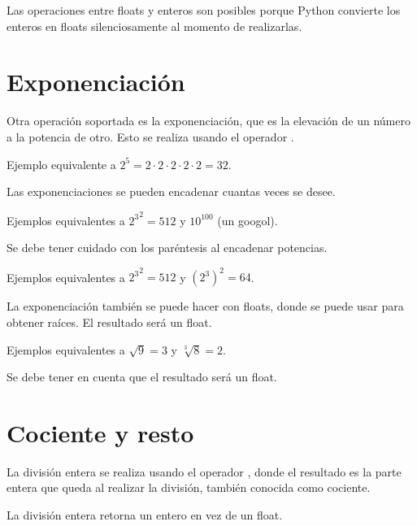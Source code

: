 Las operaciones entre floats y enteros son posibles porque Python convierte los enteros en floats silenciosamente al momento de realizarlas.

\section{Exponenciación}

Otra operación soportada es la exponenciación, que es la elevación de un número a la potencia de otro. Esto se realiza usando el operador \ttt{**}.\smallskip

Ejemplo equivalente a $2 ^ 5 = 2\cdot 2\cdot 2\cdot 2\cdot 2 = 32$.


Las exponenciaciones se pueden encadenar cuantas veces se desee.\smallskip

Ejemplos equivalentes a ${2 ^ 3} ^ 2 = 512$ y $10 ^ {100}$ (un googol).


Se debe tener cuidado con los paréntesis al encadenar potencias.\smallskip

Ejemplos equivalentes a ${2 ^ 3} ^ 2 = 512$ y $(2 ^ 3) ^ 2 = 64$.


La exponenciación también se puede hacer con floats, donde se puede usar para obtener raíces. El resultado será un float.\smallskip

Ejemplos equivalentes a $\sqrt{9} = 3$ y $\sqrt[3]{8} = 2$.


Se debe tener en cuenta que el resultado será un float.

\section{Cociente y resto}


La división entera se realiza usando el operador \ttt{//}, donde el resultado es la parte entera que queda al realizar la división, también conocida como cociente.\smallskip

La división entera retorna un entero en vez de un float.

